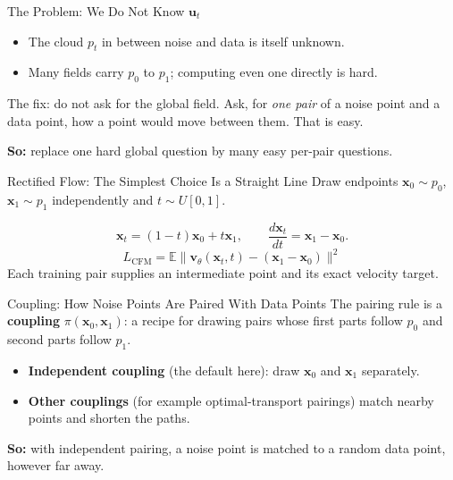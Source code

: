 \documentclass{ntuabeamer}
\begin{document}
\begin{frame}{The Problem: We Do Not Know \(\mathbf u_t\)}
  \begin{itemize}
    \item The cloud \(p_t\) in between noise and data is itself unknown.
    \item Many fields carry \(p_0\) to \(p_1\); computing even one directly is hard.
  \end{itemize}
  The fix: do not ask for the global field. Ask, for \emph{one pair} of a noise point and a data point,
  how a point would move between them. That is easy.

  \medskip
  \textbf{So:} replace one hard global question by many easy per-pair questions.
\end{frame}

\begin{frame}{Rectified Flow: The Simplest Choice Is a Straight Line}
  Draw endpoints \(\mathbf x_0\sim p_0\), \(\mathbf x_1\sim p_1\) independently and \(t\sim U[0,1]\).
  \begin{center}
  \end{center}
  \[\mathbf x_t=(1-t)\mathbf x_0+t\mathbf x_1,\qquad \frac{d\mathbf x_t}{dt}=\mathbf x_1-\mathbf x_0.\]
  \[\boxed{L_{\mathrm{CFM}}=\mathbb E\|\mathbf v_\theta(\mathbf x_t,t)-(\mathbf x_1-\mathbf x_0)\|^2}\]
  Each training pair supplies an intermediate point and its exact velocity target.
\end{frame}

\begin{frame}{Coupling: How Noise Points Are Paired With Data Points}
  The pairing rule is a \textbf{coupling} \(\pi(\mathbf x_0,\mathbf x_1)\): a recipe for drawing pairs
  whose first parts follow \(p_0\) and second parts follow \(p_1\).
  \begin{itemize}
    \item \textbf{Independent coupling} (the default here): draw \(\mathbf x_0\) and \(\mathbf x_1\) separately.
    \item \textbf{Other couplings} (for example optimal-transport pairings) match nearby points and shorten the paths.
  \end{itemize}
  \textbf{So:} with independent pairing, a noise point is matched to a random data point, however far away.
\end{frame}
\end{document}
